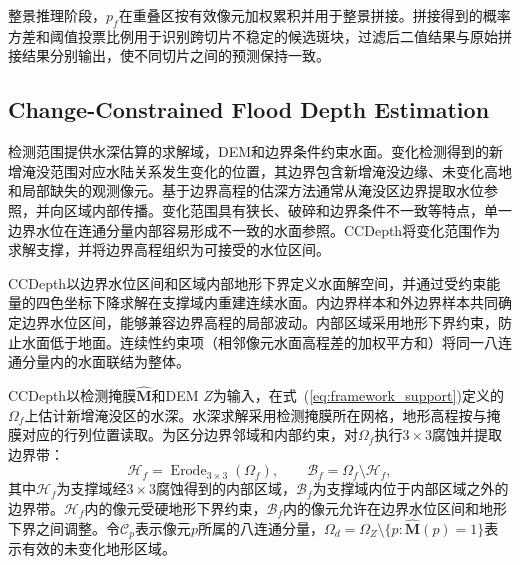 \documentclass[authoryear,preprint,12pt]{elsarticle}
\begin{document}
整景推理阶段，\(p_f\)在重叠区按有效像元加权累积并用于整景拼接。拼接得到的概率方差和阈值投票比例用于识别跨切片不稳定的候选斑块，过滤后二值结果与原始拼接结果分别输出，使不同切片之间的预测保持一致。

\subsection{Change-Constrained Flood Depth Estimation}\label{sec:ccdepth}

检测范围提供水深估算的求解域，DEM和边界条件约束水面。变化检测得到的新增淹没范围对应水陆关系发生变化的位置，其边界包含新增淹没边缘、未变化高地和局部缺失的观测像元。基于边界高程的估深方法通常从淹没区边界提取水位参照，并向区域内部传播\citep{cohen2019floodwater,betterle2024water}。变化范围具有狭长、破碎和边界条件不一致等特点，单一边界水位在连通分量内部容易形成不一致的水面参照。CCDepth将变化范围作为求解支撑，并将边界高程组织为可接受的水位区间。

CCDepth以边界水位区间和区域内部地形下界定义水面解空间，并通过受约束能量的四色坐标下降求解在支撑域内重建连续水面。内边界样本和外边界样本共同确定边界水位区间，能够兼容边界高程的局部波动。内部区域采用地形下界约束，防止水面低于地面。连续性约束项（相邻像元水面高程差的加权平方和）将同一八连通分量内的水面联结为整体。

CCDepth以检测掩膜\(\hat{\mathbf M}\)和DEM \(Z\)为输入，在式~(\ref{eq:framework_support})定义的\(\Omega_f\)上估计新增淹没区的水深。水深求解采用检测掩膜所在网格，地形高程按与掩膜对应的行列位置读取。为区分边界邻域和内部约束，对\(\Omega_f\)执行\(3\times3\)腐蚀并提取边界带：
\begin{equation}\label{eq:ccdepth_domains}
 \mathcal H_f=\operatorname{Erode}_{3\times3}(\Omega_f),\qquad
 \mathcal B_f=\Omega_f\setminus\mathcal H_f,
\end{equation}
其中\(\mathcal H_f\)为支撑域经\(3\times3\)腐蚀得到的内部区域，\(\mathcal B_f\)为支撑域内位于内部区域之外的边界带。\(\mathcal H_f\)内的像元受硬地形下界约束，\(\mathcal B_f\)内的像元允许在边界水位区间和地形下界之间调整。令\(\mathcal C_p\)表示像元\(p\)所属的八连通分量，\(\Omega_d=\Omega_Z\setminus\{p:\hat{\mathbf M}(p)=1\}\)表示有效的未变化地形区域。
\end{document}
